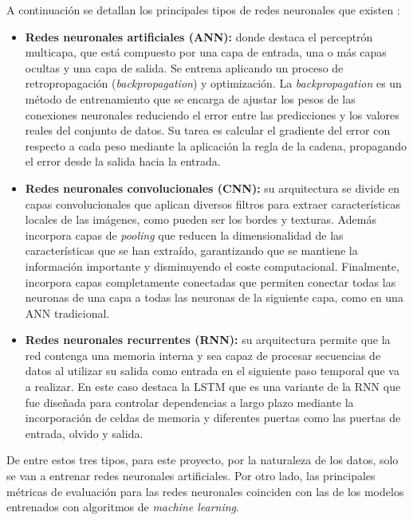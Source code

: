 A continuación se detallan los principales tipos de redes neuronales que existen \cite{tipos-redes}:
\begin{itemize}
    \item \textbf{Redes neuronales artificiales (ANN):} donde destaca el perceptrón multicapa, que  está compuesto por una capa de entrada, una o más capas ocultas y una capa de salida. Se entrena aplicando un proceso de retropropagación (\textit{backpropagation}) y optimización. La \textit{backpropagation} es un método de entrenamiento que se encarga de ajustar los pesos de las conexiones neuronales reduciendo el error entre las predicciones y los valores reales del conjunto de datos. Su tarea es calcular el gradiente del error con respecto a cada peso mediante la aplicación la regla de la cadena, propagando el error desde la salida hacia la entrada.
    \item \textbf{Redes neuronales convolucionales (CNN):} su arquitectura se divide en capas convolucionales que aplican diversos filtros para extraer características locales de las imágenes, como pueden ser los bordes y texturas. Además incorpora capas de \textit{pooling} que reducen la dimensionalidad de las características que se han extraído, garantizando que se mantiene la información importante y disminuyendo el coste computacional. Finalmente, incorpora capas completamente conectadas que permiten conectar todas las neuronas de una capa a todas las neuronas de la siguiente capa, como en una ANN tradicional.
    \item \textbf{Redes neuronales recurrentes (RNN):} su arquitectura permite que la red contenga una memoria interna y sea capaz de procesar secuencias de datos al utilizar su salida como entrada en el siguiente paso temporal que va a realizar. En este caso destaca la LSTM que es una variante de la RNN que fue diseñada para controlar dependencias a largo plazo mediante la incorporación de celdas de memoria y diferentes puertas como las puertas de entrada, olvido y salida.

\end{itemize}

De entre estos tres tipos, para este proyecto, por la naturaleza de los datos, solo se van a entrenar redes neuronales artificiales. Por otro lado, las principales métricas de evaluación para las redes neuronales coinciden con las de los modelos entrenados con algoritmos de \textit{machine learning}.


